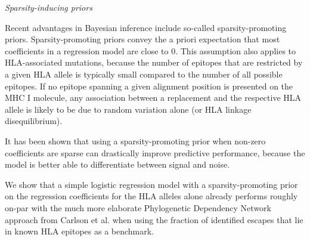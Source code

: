 \documentclass[fleqn,11pt]{SelfArx} %
\begin{document}
  \textit{Sparsity-inducing priors}
  
  Recent advantages in Bayesian inference include so-called sparsity-promoting priors. Sparsity-promoting priors convey the a priori expectation that most coefficients in a regression model are close to 0. This assumption also applies to HLA-associated mutations, because the number of epitopes that are restricted by a given HLA allele is typically small compared to the number of all possible epitopes. If no epitope spanning a given alignment position is presented on the MHC I molecule, any association between a replacement and the respective HLA allele  is likely to be due to random variation alone (or HLA linkage disequilibrium).
  
  It has been shown that using a sparsity-promoting prior when non-zero coefficients are sparse can drastically improve predictive performance, because the model is better able to differentiate between signal and noise.

  We show that a simple logistic regression model with a sparsity-promoting prior on the regression coefficients for the HLA alleles alone already performs roughly on-par  with the much more elaborate Phylogenetic Dependency Network approach from Carlson et al. when using the fraction of identified escapes that lie in known HLA epitopes as a benchmark.

  


\end{document}
